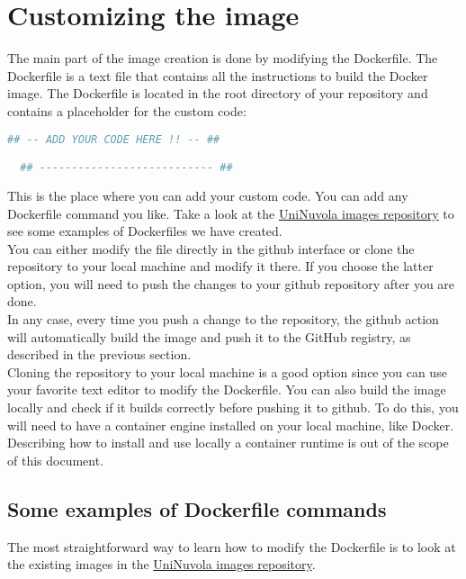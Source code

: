 \section{Customizing the image}\label{image_customization}
The main part of the image creation is done by modifying the Dockerfile. The
Dockerfile is a text file that contains all the instructions to build the
Docker image. The Dockerfile is located in the root directory of your
repository and contains a placeholder for the custom code:
\begin{lstlisting}[language=python]
  ## -- ADD YOUR CODE HERE !! -- ##

  ## --------------------------- ##
\end{lstlisting}
This is the place where you can add your custom code. You can add any
Dockerfile command you like. Take a look at the \href{https://github.com/UniNuvola/images}
{UniNuvola images repository} to see some examples of Dockerfiles we have
created. \\
You can either modify the file directly in the github interface or clone the
repository to your local machine and modify it there. If you choose the
latter option, you will need to push the changes to your github repository
after you are done. \\
In any case, every time you push a change to the repository, the github action will
automatically build the image and push it to the GitHub registry, as described in
the previous section. \\
Cloning the repository to your local machine is a good option since you 
can use your favorite text editor to modify the Dockerfile. You can also
build the image locally and check if it builds correctly before pushing it to
github. To do this, you will need to have a container engine installed on
your local machine, like Docker. \\
Describing how to install and use locally a container runtime is out of the scope of this document.

\subsection{Some examples of Dockerfile commands}

The most straightforward way to learn how to modify the Dockerfile is to
look at the existing images in the \href{https://github.com/UniNuvola/images}
{UniNuvola images repository}.

